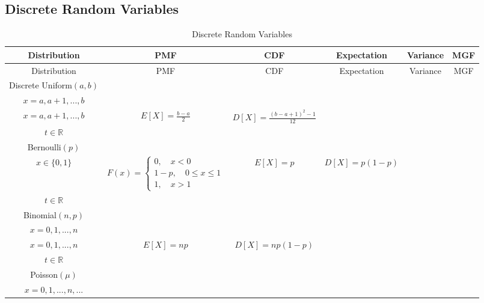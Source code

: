 \documentclass[10pt]{book}
\begin{document}
			\begin{landscape}
			\section{Discrete Random Variables}
				\begin{longtable}[c]{|c|c|c|c|c|c|}
					\caption{Discrete Random Variables \label{DRV}}\\
					\hline
					Distribution & PMF & CDF & Expectation & Variance & MGF \\
					\hline
					\endfirsthead
					\hline
					Distribution & PMF & CDF & Expectation & Variance & MGF \\
					\hline
					\endhead
					Discrete Uniform$(a, b)$ & 
					\makecell{$f(x)=\frac1{b-a+1}$ \\ $x=a, a+1, ..., b$} & 
					\makecell{$F(x)=\frac{x-a+1}{b-a+1}$ \\ $x=a, a+1, ..., b$} & 
					$E[X]=\frac{b-a}{2}$ & 
					$D[X]=\frac{(b-a+1)^2-1}{12}$ & 
					\makecell{$M(t)=\frac{e^{at}-e^{(b+1)t}}{(b-a+1)(1-e^t)}$ \\ $t \in \mathbb{R}$} \\
					\hline
					Bernoulli$(p)$ & 
					\makecell{$f(x)=p^x(1-p)^{1-x}$ \\ $x \in \{0,1\}$} &
					$F(x)=\begin{cases}0, \quad x<0 \\ 
										1-p, \quad 0\le x \le 1 \\
										1, \quad x>1\end{cases}$ & 
					$E[X]=p$ & 
					$D[X]=p(1-p)$ & 
					\makecell{$M(t)=1-p+pe^{t}$ \\ $t\in \mathbb{R}$}\\
					\hline
					Binomial$(n, p)$ &
					\makecell{$f(x)=\left(\begin{matrix}n\\x\end{matrix}\right)p^x(1-p)^{n-x}$ \\ $x=0,1,...,n$} &
					\makecell{$F(x)=\sum_{k=0}^{x}\left(\begin{matrix}n\\k\end{matrix}\right)p^k(1-p)^{n-k}$ \\ $x=0,1,...,n$} &
					$E[X]=np$ &
					$D[X]=np(1-p)$ &
					\makecell{$M(t)=(1-p+pe^{t})^n$ \\ $t\in \mathbb{R}$}\\
					\hline
					Poisson$(\mu)$ &
					\makecell{$f(x)=\frac{\mu^xe^\mu}{x!}$ \\ $x = 0,1,...,n,...$} &

\end{longtable}
\end{landscape}
\end{document}
